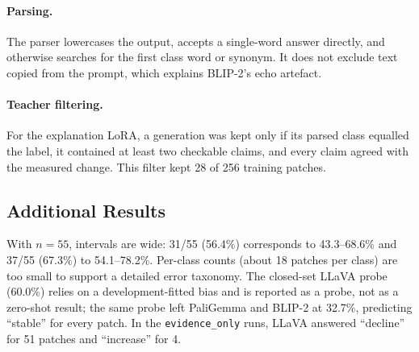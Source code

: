 \documentclass[11pt]{article}
\begin{document}
\paragraph{Parsing.} The parser lowercases the output, accepts a
single-word answer directly, and otherwise searches for the first class
word or synonym. It does not exclude text copied from the prompt, which
explains BLIP-2's echo artefact.

\paragraph{Teacher filtering.} For the explanation LoRA, a generation
was kept only if its parsed class equalled the label, it contained at
least two checkable claims, and every claim agreed with the measured
change. This filter kept 28 of 256 training patches.

\subsection{Additional Results}

With $n = 55$, intervals are wide: 31/55 (56.4\%) corresponds to
43.3--68.6\% and 37/55 (67.3\%) to 54.1--78.2\%. Per-class counts
(about 18 patches per class) are too small to support a detailed error
taxonomy. The closed-set LLaVA probe (60.0\%) relies on a
development-fitted bias and is reported as a probe, not as a zero-shot
result; the same probe left PaliGemma and BLIP-2 at 32.7\%, predicting
``stable'' for every patch. In the \texttt{evidence\_only} runs, LLaVA
answered ``decline'' for 51 patches and ``increase'' for 4.
\end{document}
